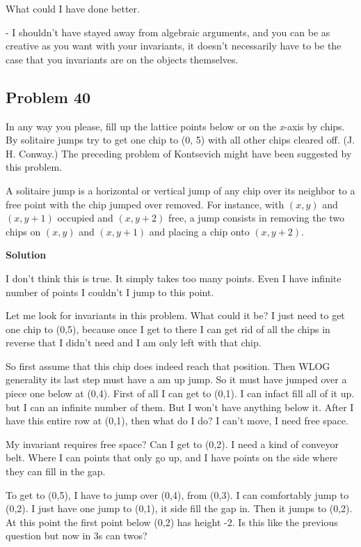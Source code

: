 \documentclass[12pt,tikz,border=10pt]{article}
\theoremstyle{definition}
\theoremstyle{remark}
\begin{document}
What could I have done better.

- I shouldn't have stayed away from algebraic arguments, and you can be as creative as you want with your invariants, it doesn't necessarily have to be the 
case that you invariants are on the objects themselves.


\subsection{Problem 40}

In any way you please, fill up the lattice points below or on the \textit{x}-axis by chips. By
solitaire jumps try to get one chip to (0, 5) with all other chips cleared off. (J. H.
Conway.) The preceding problem of Kontsevich might have been suggested by this
problem.

A solitaire jump is a horizontal or vertical jump of any chip over its neighbor to a free
point with the chip jumped over removed. For instance, with $(x, y)$ and $(x, y +1)$
occupied and $(x, y +2)$ free, a jump consists in removing the two chips on $(x, y)$
and $(x, y +1)$ and placing a chip onto $(x, y +2)$.

\textbf{Solution}

I don't think this is true. It simply takes too many points. Even I have infinite number of points I couldn't I 
jump to this point.


Let me look for invariants in this problem. What could it be?
I just need to get one chip to (0,5), because once I get to there I can get rid of all the chips in reverse that I didn't need and I am only left with that chip.


So first assume that this chip does indeed reach that position. Then WLOG generality its last step must have a am up jump. So it must have jumped over
a piece one below at (0,4). First of all I can get to (0,1). I can infact fill all of it up. but I can an infinite number of them. But I won't have anything below it.
After I have this entire row at (0,1), then what do I do? I can't move, I need free space.

My invariant requires free space? Can I get to (0,2). I need a kind of conveyor belt. Where I can points that only go up, and I have points on the side where they can fill in the gap.

To get to (0,5), I have to jump over (0,4), from (0,3). I can comfortably jump to (0,2). I just
have one jump to (0,1), it side fill the gap in. Then it jumps to (0,2). At this point the first point below
(0,2) has height -2. Is this like the previous question but now in 3s can twos?
\end{document}
